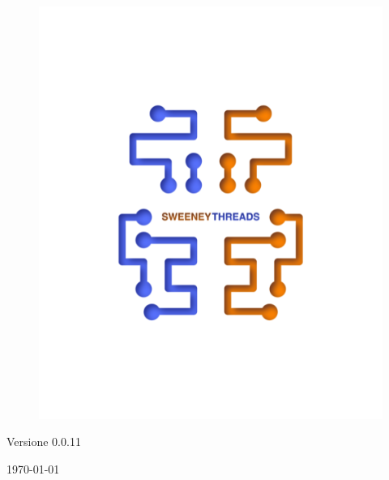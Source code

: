 \documentclass[a4paper]{article}
\begin{document}
\begin{titlepage}
		\begin{figure}[H]
			\centering
			\includegraphics[scale=0.8]{sweeney.png}
		\end{figure}
		\begin{center}
			Versione 0.0.11
		\end{center}
		{\large \today}\\[3cm] 
		\vfill  
	\end{titlepage}
	
	
	\tableofcontents
	
	\newpage 
\end{document}
